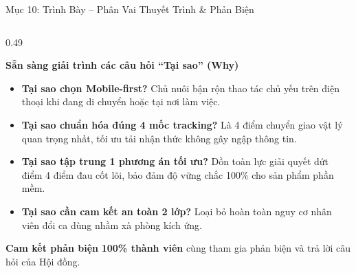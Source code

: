 \begin{frame}{Mục 10: Trình Bày -- Phân Vai Thuyết Trình \& Phản Biện}
\begin{columns}[T]
    \begin{column}{0.49\textwidth}
      \begin{exampleblock}{\footnotesize \textbf{Sẵn sàng giải trình các câu hỏi ``Tại sao'' (Why)}}
        \tiny
        \begin{itemize}
          \setlength\itemsep{0.8mm}
          \item \textbf{Tại sao chọn Mobile-first?} Chủ nuôi bận rộn thao tác chủ yếu trên điện thoại khi đang di chuyển hoặc tại nơi làm việc.
          \item \textbf{Tại sao chuẩn hóa đúng 4 mốc tracking?} Là 4 điểm chuyển giao vật lý quan trọng nhất, tối ưu tải nhận thức không gây ngập thông tin.
          \item \textbf{Tại sao tập trung 1 phương án tối ưu?} Dồn toàn lực giải quyết dứt điểm 4 điểm đau cốt lõi, bảo đảm độ vững chắc 100\% cho sản phẩm phần mềm.
          \item \textbf{Tại sao cần cam kết an toàn 2 lớp?} Loại bỏ hoàn toàn nguy cơ nhân viên đổi ca dùng nhầm xà phòng kích ứng.
        \end{itemize}
      \end{exampleblock}

      \vspace{-1mm}
      \begin{alertblock}{\centering \scriptsize \textbf{Cam kết phản biện}}
        \centering \tiny
        \textbf{100\% thành viên} cùng tham gia phản biện và trả lời câu hỏi của Hội đồng.
      \end{alertblock}
    \end{column}
  \end{columns}
\end{frame}
